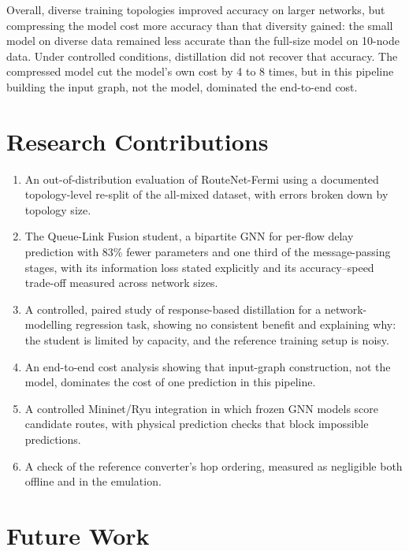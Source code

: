Overall, diverse training topologies improved accuracy on larger networks, but compressing the model cost more accuracy than that diversity gained: the small model on diverse data remained less accurate than the full-size model on 10-node data. Under controlled conditions, distillation did not recover that accuracy. The compressed model cut the model's own cost by 4 to 8 times, but in this pipeline building the input graph, not the model, dominated the end-to-end cost.

\section{Research Contributions}

\begin{enumerate}
  \item An out-of-distribution evaluation of RouteNet-Fermi using a documented topology-level re-split of the all-mixed dataset, with errors broken down by topology size.
  \item The Queue-Link Fusion student, a bipartite GNN for per-flow delay prediction with 83\% fewer parameters and one third of the message-passing stages, with its information loss stated explicitly and its accuracy--speed trade-off measured across network sizes.
  \item A controlled, paired study of response-based distillation for a network-modelling regression task, showing no consistent benefit and explaining why: the student is limited by capacity, and the reference training setup is noisy.
  \item An end-to-end cost analysis showing that input-graph construction, not the model, dominates the cost of one prediction in this pipeline.
  \item A controlled Mininet/Ryu integration in which frozen GNN models score candidate routes, with physical prediction checks that block impossible predictions.
  \item A check of the reference converter's hop ordering, measured as negligible both offline and in the emulation.
\end{enumerate}

\section{Future Work}
\label{sec:future}

